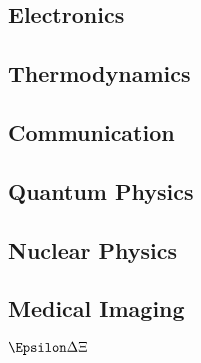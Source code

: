 \documentclass[]{article}
\begin{document}
\subsection{Electronics}\label{header-n138}

\subsection{Thermodynamics}\label{header-n140}

\subsection{Communication}\label{header-n142}

\subsection{Quantum Physics}\label{header-n144}

\subsection{Nuclear Physics}\label{header-n146}

\subsection{Medical Imaging}\label{header-n148}

\(\Epsilon \Delta\Xi\)
\end{document}
